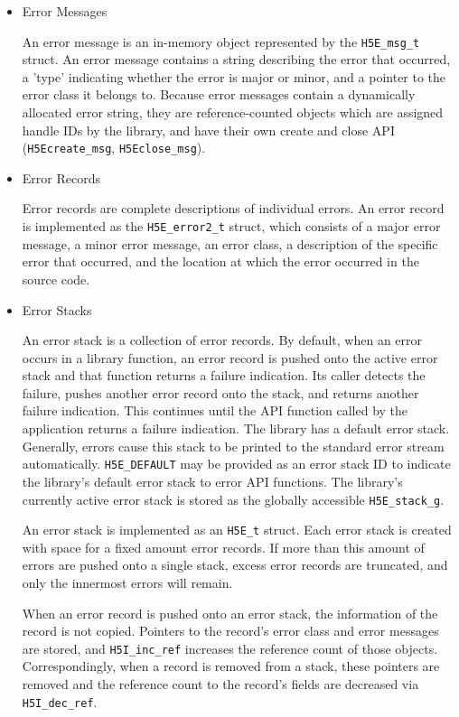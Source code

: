 \begin{itemize}

\item Error Messages

An error message is an in-memory object represented by the \texttt{H5E\_msg\_t} struct. An error message contains a string describing the error that occurred, a 'type' indicating whether the error is major or minor, and a pointer to the error class it belongs to. Because error messages contain a dynamically allocated error string, they are reference-counted objects which are assigned handle IDs by the library, and have their own create and close API (\texttt{H5Ecreate\_msg}, \texttt{H5Eclose\_msg}).

\item Error Records

Error records are complete descriptions of individual errors. An error record is implemented as the \texttt{H5E\_error2\_t} struct, which consists of a major error message, a minor error message, an error class, a description of the specific error that occurred, and the location at which the error occurred in the source code. 

\item Error Stacks

An error stack is a collection of error records. By default, when an error occurs in a library function, an error record is pushed onto the active error stack and that function returns a failure indication. Its caller detects the failure, pushes another error record onto the stack, and returns another failure indication. This continues until the API function called by the application returns a failure indication. The library has a default error stack. Generally, errors cause this stack to be printed to the standard error stream automatically. \texttt{H5E\_DEFAULT} may be provided as an error stack ID to indicate the library's default error stack to error API functions. The library's currently active error stack is stored as the globally accessible \texttt{H5E\_stack\_g}. 

An error stack is implemented as an \texttt{H5E\_t} struct. Each error stack is created with space for a fixed amount error records. If more than this amount of errors are pushed onto a single stack, excess error records are truncated, and only the innermost errors will remain.

When an error record is pushed onto an error stack, the information of the record is not copied. Pointers to the record's error class and error messages are stored, and \texttt{H5I\_inc\_ref} increases the reference count of those objects. Correspondingly, when a record is removed from a stack, these pointers are removed and the reference count to the record's fields are decreased via \texttt{H5I\_dec\_ref}.


\end{itemize}
